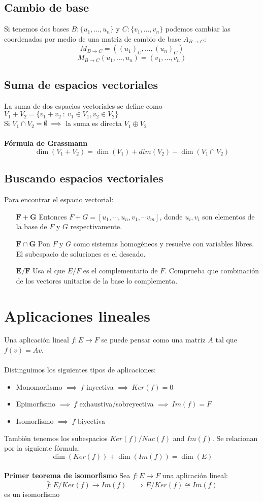 \documentclass[12pt]{article}
\begin{document}
	\subsection{Cambio de base}
	Si tenemos dos bases $B:\{u_1,...,u_n\}$ y $C:\{v_1,...,v_n\}$ podemos cambiar las coordenadas por medio de una matriz de cambio de base $A_{B\rightarrow C}$:
	\[M_{B\rightarrow C}=((u_1)_C,...,(u_n)_C)\]
	\[M_{B\rightarrow C}(u_1,...,u_n)=(v_1,...,v_n)\]
	
	\subsection{Suma de espacios vectoriales}
	La suma de dos espacios vectoriales se define como \(V_1+V_2=\{v_1+v_2\ : \ v_1\in V_1, v_2\in V_2\}\) \\ 
	Si \(V_1\cap V_2=\emptyset \ \implies \) la suma es directa $V_1 \oplus V_2$\\ \\
	\textbf{Fórmula de Grassmann}\\
	$$\boxed{\dim(V_1+V_2)=\dim(V_1)+dim(V_2)-\dim(V_1\cap V_2)}$$
	
	\subsection{Buscando espacios vectoriales}
	Para encontrar el espacio vectorial:
	\begin{itemize}
		\item[$\mathbf{F+G}$] Entonces $F+G=[u_1,\cdots,u_n, v_1,\cdots v_m]$, donde $u_i, v_i$ son elementos de la base de $F$ y $G$ respectivamente.  
		\item[$\mathbf{F\cap G}$] Pon $F$ y $G$ como sistemas homogéneos y resuelve con variables libres. El subespacio de soluciones es el deseado.
		\item[$\mathbf{E/F}$] Usa el que $E/F$ es el complementario de $F$. Comprueba que combinación de los vectores unitarios de la base lo complementa.
	\end{itemize}
	
\section{Aplicaciones lineales}
	Una aplicación lineal $f: E\to F$ se puede pensar como una matriz $A$ tal que $f(v)=Av$.\\ \\
	Distinguimos los siguientes tipos de aplicaciones:
	\begin{itemize}
		\item Monomorfismo $\implies \ f$ inyectiva $\implies \ Ker(f)=0$
		\item Epimorfismo $\implies \ f$ exhaustiva/sobreyectiva $\implies \ Im(f)=F$
		\item Isomorfismo $\implies \ f$ biyectiva
    \end{itemize}
    También tenemos los subespacios $Ker(f)/Nuc(f)$ and $Im(f)$. Se relacionan por la siguiente fórmula:
    \[\dim(Ker(f))+\dim(Im(f))=\dim(E)\]
    \\
	\textbf{Primer teorema de isomorfismo}
	Sea $f: E\to F$ una aplicación lineal:
	$$\boxed{\bar{f}: E/Ker(f) \to Im(f) \ \ \ \implies E/Ker(f) \cong Im(f) }$$
	es un isomorfismo
	
\end{document}
